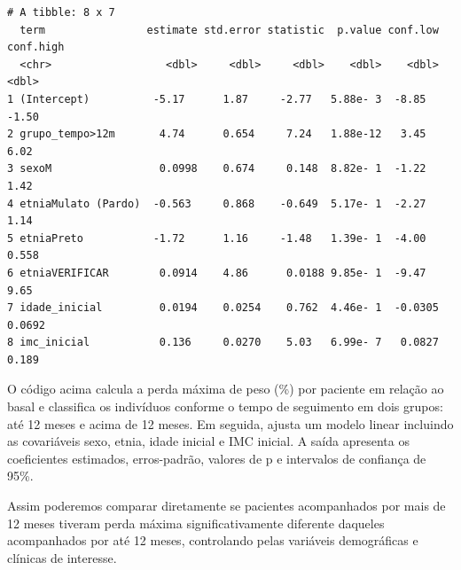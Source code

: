 \documentclass[
]{article}
\begin{document}
\begin{verbatim}
# A tibble: 8 x 7
  term                estimate std.error statistic  p.value conf.low conf.high
  <chr>                  <dbl>     <dbl>     <dbl>    <dbl>    <dbl>     <dbl>
1 (Intercept)          -5.17      1.87     -2.77   5.88e- 3  -8.85     -1.50  
2 grupo_tempo>12m       4.74      0.654     7.24   1.88e-12   3.45      6.02  
3 sexoM                 0.0998    0.674     0.148  8.82e- 1  -1.22      1.42  
4 etniaMulato (Pardo)  -0.563     0.868    -0.649  5.17e- 1  -2.27      1.14  
5 etniaPreto           -1.72      1.16     -1.48   1.39e- 1  -4.00      0.558 
6 etniaVERIFICAR        0.0914    4.86      0.0188 9.85e- 1  -9.47      9.65  
7 idade_inicial         0.0194    0.0254    0.762  4.46e- 1  -0.0305    0.0692
8 imc_inicial           0.136     0.0270    5.03   6.99e- 7   0.0827    0.189 
\end{verbatim}

O código acima calcula a perda máxima de peso (\%) por paciente em
relação ao basal e classifica os indivíduos conforme o tempo de
seguimento em dois grupos: até 12 meses e acima de 12 meses. Em seguida,
ajusta um modelo linear incluindo as covariáveis sexo, etnia, idade
inicial e IMC inicial. A saída apresenta os coeficientes estimados,
erros-padrão, valores de p e intervalos de confiança de 95\%.

Assim poderemos comparar diretamente se pacientes acompanhados por mais
de 12 meses tiveram perda máxima significativamente diferente daqueles
acompanhados por até 12 meses, controlando pelas variáveis demográficas
e clínicas de interesse.
\end{document}
